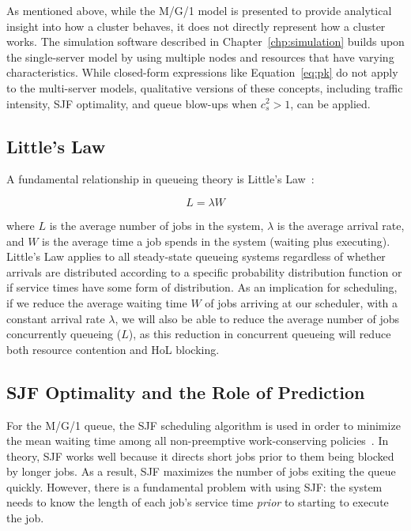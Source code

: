 \clearpage
As mentioned above, while the M/G/1 model is presented to provide analytical insight into how a cluster behaves, it does not directly represent how a cluster works. The simulation software described in Chapter~\ref{chp:simulation} builds upon the single-server model by using multiple nodes and resources that have varying characteristics. While closed-form expressions like Equation~\ref{eq:pk} do not apply to the multi-server models, qualitative versions of these concepts, including traffic intensity, SJF optimality, and queue blow-ups when $c_s^2 > 1$, can be applied.

\subsection{Little's Law}

A fundamental relationship in queueing theory is Little's Law~\cite{kleinrock1975queueing}:

\begin{equation}
    L = \lambda W
    \label{eq:little}
\end{equation}

where $L$ is the average number of jobs in the system, $\lambda$ is the average arrival rate, and $W$ is the average time a job spends in the system (waiting plus executing). Little's Law applies to all steady-state queueing systems regardless of whether arrivals are distributed according to a specific probability distribution function or if service times have some form of distribution. As an implication for scheduling, if we reduce the average waiting time $W$ of jobs arriving at our scheduler, with a constant arrival rate $\lambda$, we will also be able to reduce the average number of jobs concurrently queueing ($L$), as this reduction in concurrent queueing will reduce both resource contention and HoL blocking.

\subsection{SJF Optimality and the Role of Prediction}

For the M/G/1 queue, the SJF scheduling algorithm is used in order to minimize the mean waiting time among all non-preemptive work-conserving policies~\cite{kleinrock1975queueing,harchol2013performance}. In theory, SJF works well because it directs short jobs prior to them being blocked by longer jobs. As a result, SJF maximizes the number of jobs exiting the queue quickly. However, there is a fundamental problem with using SJF: the system needs to know the length of each job's service time \textit{prior} to starting to execute the job.

